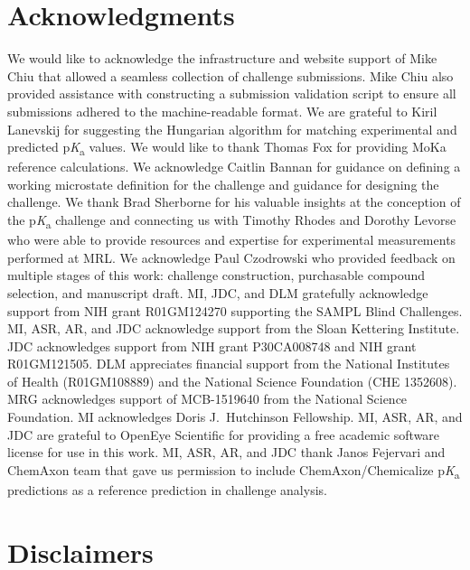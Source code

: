 \documentclass[9pt,lineno,final]{elife}
\newcommand{\pKa}{p\textit{K}\textsubscript{a}}
\begin{document}
\section{Acknowledgments}

We would like to acknowledge the infrastructure and website support of Mike Chiu that allowed a seamless collection of challenge submissions. 
Mike Chiu also provided assistance with constructing a submission validation script to ensure all submissions adhered to the machine-readable format. 
We are grateful to Kiril Lanevskij for suggesting the Hungarian algorithm for matching experimental and predicted \pKa{} values. 
We would like to thank Thomas Fox for providing MoKa reference calculations.
We acknowledge Caitlin Bannan for guidance on defining a working microstate definition for the challenge and guidance for designing the challenge. 
We thank Brad Sherborne for his valuable insights at the conception of the \pKa{} challenge and connecting us with Timothy Rhodes and Dorothy Levorse who were able to provide resources and expertise for experimental measurements performed at MRL. 
We acknowledge Paul Czodrowski who provided feedback on multiple stages of this work: challenge construction, purchasable compound selection, and manuscript draft. 
MI, JDC, and DLM gratefully acknowledge support from NIH grant R01GM124270 supporting the SAMPL Blind Challenges.
MI, ASR, AR, and JDC acknowledge support from the Sloan Kettering Institute.
JDC acknowledges support from NIH grant P30CA008748 and NIH grant R01GM121505. 
DLM appreciates financial support from the National Institutes of Health (R01GM108889) and the National Science Foundation (CHE 1352608).
MRG acknowledges support of MCB-1519640 from the National Science Foundation. 
MI acknowledges Doris J.\ Hutchinson Fellowship. 
MI, ASR, AR, and JDC are grateful to OpenEye Scientific for providing a free academic software license for use in this work.
MI, ASR, AR, and JDC thank Janos Fejervari and ChemAxon team that gave us permission to include ChemAxon/Chemicalize \pKa{} predictions as a reference prediction in challenge analysis. 


\section{Disclaimers}
\end{document}
